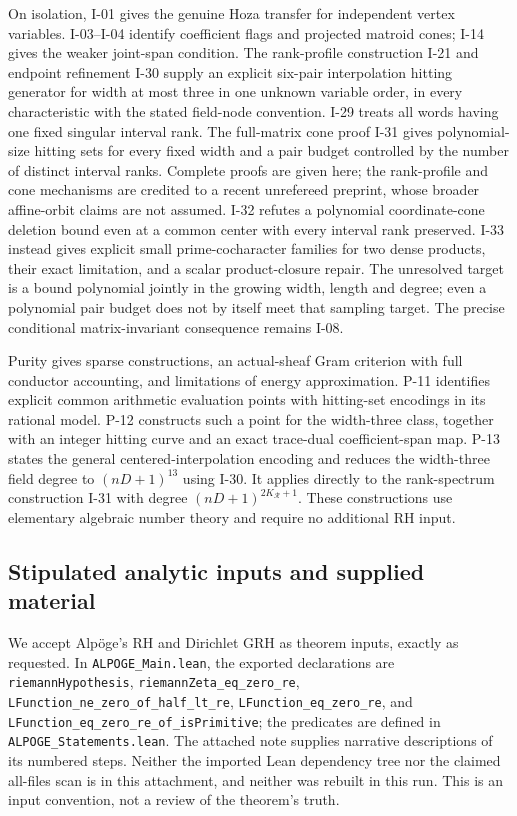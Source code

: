 On isolation, I-01 gives the genuine Hoza transfer for independent vertex variables. I-03--I-04 identify coefficient flags and projected matroid cones; I-14 gives the weaker joint-span condition. The rank-profile construction I-21 and endpoint refinement I-30 supply an explicit six-pair interpolation hitting generator for width at most three in one unknown variable order, in every characteristic with the stated field-node convention. I-29 treats all words having one fixed singular interval rank. The full-matrix cone proof I-31 gives polynomial-size hitting sets for every fixed width and a pair budget controlled by the number of distinct interval ranks. Complete proofs are given here; the rank-profile and cone mechanisms are credited to a recent unrefereed preprint, whose broader affine-orbit claims are not assumed. I-32 refutes a polynomial coordinate-cone deletion bound even at a common center with every interval rank preserved. I-33 instead gives explicit small prime-cocharacter families for two dense products, their exact limitation, and a scalar product-closure repair. The unresolved target is a bound polynomial jointly in the growing width, length and degree; even a polynomial pair budget does not by itself meet that sampling target. The precise conditional matrix-invariant consequence remains I-08.

Purity gives sparse constructions, an actual-sheaf Gram criterion with full conductor accounting, and limitations of energy approximation. P-11 identifies explicit common arithmetic evaluation points with hitting-set encodings in its rational model. P-12 constructs such a point for the width-three class, together with an integer hitting curve and an exact trace-dual coefficient-span map. P-13 states the general centered-interpolation encoding and reduces the width-three field degree to $(nD+1)^{13}$ using I-30. It applies directly to the rank-spectrum construction I-31 with degree $(nD+1)^{2K_{\mathcal R}+1}$. These constructions use elementary algebraic number theory and require no additional RH input.

\subsection{Stipulated analytic inputs and supplied material}

We accept Alp\"oge's RH and Dirichlet GRH as theorem inputs, exactly as requested. In \texttt{ALPOGE\_Main.lean}, the exported declarations are \texttt{riemannHypothesis}, \texttt{riemannZeta\_eq\_zero\_re}, \texttt{LFunction\_ne\_zero\_of\_half\_lt\_re}, \texttt{LFunction\_eq\_zero\_re}, and \texttt{LFunction\_eq\_zero\_re\_of\_isPrimitive}; the predicates are defined in \texttt{ALPOGE\_Statements.lean}. The attached note supplies narrative descriptions of its numbered steps. Neither the imported Lean dependency tree nor the claimed all-files scan is in this attachment, and neither was rebuilt in this run. This is an input convention, not a review of the theorem's truth.


